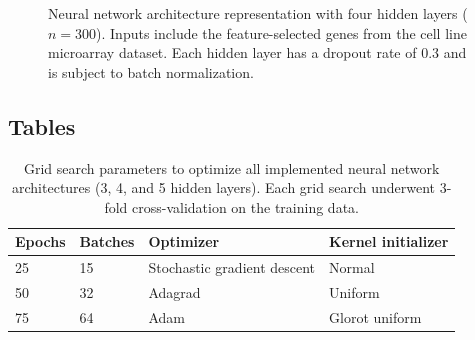 \documentclass[10pt, letterpaper]{article}
\begin{document}
\begin{figure}[!ht]
    \caption{Neural network architecture representation with four hidden layers ($n=300$). Inputs include the feature-selected genes from the cell line microarray dataset. Each hidden layer has a dropout rate of 0.3 and is subject to batch normalization.}
    \label{fig:neural_vis}
\end{figure}


\subsection*{Tables}
\begin{table}[!ht]
    \caption{Grid search parameters to optimize all implemented neural network architectures (3, 4, and 5 hidden layers). Each grid search underwent 3-fold cross-validation on the training data.}
    \centering
    \label{tab:params}
    \begin{tabular}{l l l l}
        \toprule
        Epochs & Batches & Optimizer & Kernel initializer \\
        \midrule
        25 & 15 & Stochastic gradient descent & Normal \\
        50 & 32 & Adagrad & Uniform \\
        75 & 64 & Adam & Glorot uniform \\
        \bottomrule
    \end{tabular}
\end{table}
\end{document}

